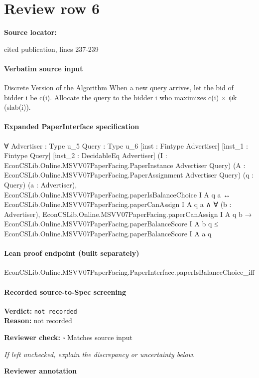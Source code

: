 \documentclass[10pt]{article}
\newcommand{\reviewerbox}{%
  \par\noindent\fbox{\parbox{0.96\linewidth}{\rule{0pt}{0.38in}}}\par
}
\newcommand{\reviewmatch}[1]{%
  \par\noindent\textbf{Reviewer check:} $\square$\; #1\par
  \noindent\emph{If left unchecked, explain the discrepancy or uncertainty below.}\par
}
\begin{document}
\section*{Review row 6}
\textbf{Source locator:} {\footnotesize\raggedright cited publication, lines 237-\allowbreak{}239\par}
\paragraph{Verbatim source input}
\begin{ReviewVerbatim}
Discrete Version of the Algorithm
When a new query arrives, let the bid of bidder i be c(i). Allocate the query to the
bidder i who maximizes c(i) × ψk (slab(i)).
\end{ReviewVerbatim}


\paragraph{Expanded PaperInterface specification}
\begin{ReviewVerbatim}
∀ {Advertiser : Type u_5} {Query : Type u_6} [inst : Fintype Advertiser] [inst_1 : Fintype Query]
  [inst_2 : DecidableEq Advertiser] (I : EconCSLib.Online.MSVV07PaperFacing.PaperInstance Advertiser Query)
  (A : EconCSLib.Online.MSVV07PaperFacing.PaperAssignment Advertiser Query) (q : Query) (a : Advertiser),
  EconCSLib.Online.MSVV07PaperFacing.paperIsBalanceChoice I A q a ↔
    EconCSLib.Online.MSVV07PaperFacing.paperCanAssign I A q a ∧
      ∀ (b : Advertiser),
        EconCSLib.Online.MSVV07PaperFacing.paperCanAssign I A q b →
          EconCSLib.Online.MSVV07PaperFacing.paperBalanceScore I A b q ≤
            EconCSLib.Online.MSVV07PaperFacing.paperBalanceScore I A a q
\end{ReviewVerbatim}

\paragraph{Lean proof endpoint (built separately)}\begin{ReviewVerbatim}
EconCSLib.Online.MSVV07PaperFacing.PaperInterface.paperIsBalanceChoice_iff
\end{ReviewVerbatim}

\paragraph{Recorded source-to-Spec screening}
\textbf{Verdict:} \texttt{not recorded}
\\
\textbf{Reason:} not recorded
\reviewmatch{Matches source input}
\noindent\textbf{Reviewer annotation}\par
\reviewerbox
\clearpage
\hypertarget{source-claim-aa89dcfdc20d7b16}{}
\end{document}
